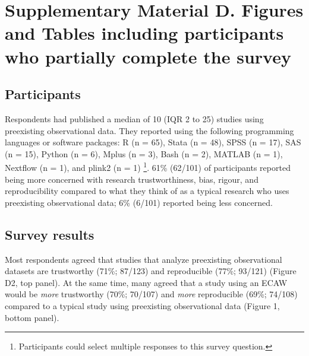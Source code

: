 \documentclass[
  man,floatsintext]{apa6}
\begin{document}
{\smaller[1]
\begin{singlespace}



\end{singlespace}
}

\pagebreak

\hypertarget{supplementary-material-d.-figures-and-tables-including-participants-who-partially-complete-the-survey}{%
\section{Supplementary Material D. Figures and Tables including participants who partially complete the survey}\label{supplementary-material-d.-figures-and-tables-including-participants-who-partially-complete-the-survey}}

\hypertarget{participants-2}{%
\subsection{Participants}\label{participants-2}}

Respondents had published a median of 10 (IQR 2 to 25) studies using preexisting observational data. They reported using the following programming languages or software packages: R (n = 65), Stata (n = 48), SPSS (n = 17), SAS (n = 15), Python (n = 6), Mplus (n = 3), Bash (n = 2), MATLAB (n = 1), Nextflow (n = 1), and plink2 (n = 1) \footnote[1]{Participants could select multiple responses to this survey question.}. 61\% (62/101) of participants reported being more concerned with research trustworthiness, bias, rigour, and reproducibility compared to what they think of as a typical research who uses preexisting observational data; 6\% (6/101) reported being less concerned.

\hypertarget{survey-results-1}{%
\subsection{Survey results}\label{survey-results-1}}

Most respondents agreed that studies that analyze preexisting observational datasets are trustworthy (71\%; 87/123) and reproducible (77\%; 93/121) (Figure D2, top panel). At the same time, many agreed that a study using an ECAW would be \emph{more} trustworthy (70\%; 70/107) and \emph{more} reproducible (69\%; 74/108) compared to a typical study using preexisting observational data (Figure 1, bottom panel).
\end{document}
